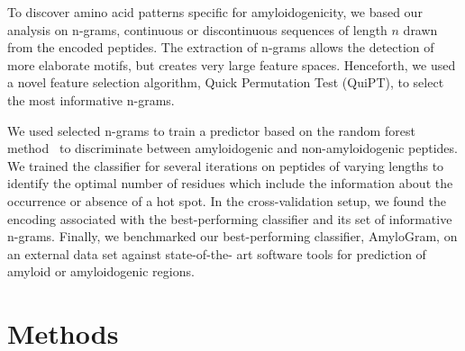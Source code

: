 \documentclass[fleqn,10pt,twoside]{gcb15submission}
\begin{document}
  To discover amino acid patterns specific for amyloidogenicity, we based our 
analysis on n-grams, continuous or discontinuous sequences of length $n$ drawn 
from the encoded peptides. The extraction of n-grams allows the detection of 
more elaborate motifs, but creates very large feature spaces. Henceforth, we 
used a novel feature selection algorithm, Quick Permutation Test (QuiPT), to 
select the most informative n-grams.

  We used selected n-grams to train a predictor based on the random forest 
method~\citep{breiman_random_2001} to discriminate between amyloidogenic and 
non-amyloidogenic peptides. We trained the classifier for several iterations on 
peptides of varying lengths to identify the optimal number of residues which 
include the information about the occurrence or absence of a hot spot. In the 
cross-validation setup, we found the encoding associated with the 
best-performing classifier and its set of informative n-grams. Finally, we 
benchmarked our best-performing classifier, AmyloGram, on an external data set 
against state-of-the- art software tools for prediction of amyloid or 
amyloidogenic regions.

\section{Methods}
\end{document}
